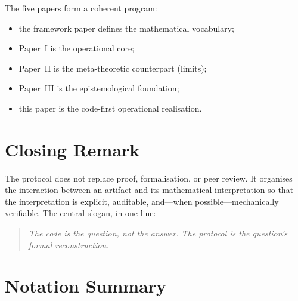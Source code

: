\documentclass[11pt,a4paper]{article}
\theoremstyle{definition}
\theoremstyle{plain}
\begin{document}
The five papers form a coherent program:
\begin{itemize}
  \item the framework paper defines the mathematical vocabulary;
  \item Paper~I is the operational core;
  \item Paper~II is the meta-theoretic counterpart (limits);
  \item Paper~III is the epistemological foundation;
  \item this paper is the code-first operational realisation.
\end{itemize}

\section{Closing Remark}

The protocol does not replace proof, formalisation, or peer review.
It organises the interaction between an artifact and its
mathematical interpretation so that the interpretation is explicit,
auditable, and---when possible---mechanically verifiable. The
central slogan, in one line:

\begin{quote}
\emph{The code is the question, not the answer. The protocol is the
question's formal reconstruction.}
\end{quote}

\appendix

\section{Notation Summary}
\label{app:notation}
\end{document}
